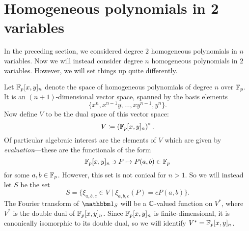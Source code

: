 \section{Homogeneous polynomials in 2 variables}\label{sec:part2}
In the preceding section, we considered degree $2$ homogeneous polynomials in $n$ variables. Now we will instead consider degree $n$ homogeneous polynomials in $2$ variables. However, we will set things up quite differently.

Let $\mathbb{F}_p[x,y]_n$ denote the space of homogeneous polynomials of degree $n$ over $\mathbb{F}_p$. It is an $(n+1)$-dimensional vector space, spanned by the basis elements
\[
	\{x^n, x^{n-1}y, \ldots, xy^{n-1}, y^n\}.
\]
Now define $V$ to be the dual space of this vector space:
\[
	V \coloneqq \left(\mathbb{F}_p[x,y]_n\right)^*.
\]
Of particular algebraic interest are the elements of $V$ which are given by \emph{evaluation}---these are the functionals of the form
\[
	\mathbb{F}_p[x,y]_n \ni P \mapsto P(a,b) \in \mathbb{F}_p
\]
for some $a,b\in \mathbb{F}_p$. However, this set is not conical for $n>1$. So we will instead let $S$ be the set
\[
	S=\{\xi_{a,b,c} \in V \mid \xi_{a,b,c}(P) = cP(a,b)\}.
\]
The Fourier transform of $\IND_S$ will be a $\mathbb{C}$-valued function on $V^*$, where $V^*$ is the double dual of $\mathbb{F}_p[x,y]_n$. Since $\mathbb{F}_p[x,y]_n$ is finite-dimensional, it is canonically isomorphic to its double dual, so we will identify $V^* = \mathbb{F}_p[x,y]_n$.

